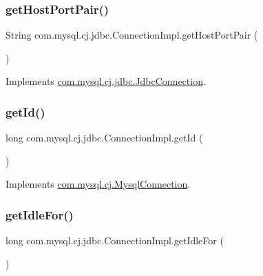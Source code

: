 \subsubsection{\texorpdfstring{get\+Host\+Port\+Pair()}{getHostPortPair()}}
{\footnotesize\ttfamily String com.\+mysql.\+cj.\+jdbc.\+Connection\+Impl.\+get\+Host\+Port\+Pair (\begin{DoxyParamCaption}{ }\end{DoxyParamCaption})}



Implements \mbox{\hyperlink{interfacecom_1_1mysql_1_1cj_1_1jdbc_1_1_jdbc_connection_aa0cc0cf69f201efa68eecad1d7a62eef}{com.\+mysql.\+cj.\+jdbc.\+Jdbc\+Connection}}.

\mbox{\label{classcom_1_1mysql_1_1cj_1_1jdbc_1_1_connection_impl_ae835f7c80a3c9705b622a244ba07e7e3}} 
\subsubsection{\texorpdfstring{get\+Id()}{getId()}}
{\footnotesize\ttfamily long com.\+mysql.\+cj.\+jdbc.\+Connection\+Impl.\+get\+Id (\begin{DoxyParamCaption}{ }\end{DoxyParamCaption})}



Implements \mbox{\hyperlink{interfacecom_1_1mysql_1_1cj_1_1_mysql_connection_aba5831e0b7016bc8b3fffa0c2e728fee}{com.\+mysql.\+cj.\+Mysql\+Connection}}.

\mbox{\label{classcom_1_1mysql_1_1cj_1_1jdbc_1_1_connection_impl_a628961d1155b35d0582a3198c2a6bb83}} 
\subsubsection{\texorpdfstring{get\+Idle\+For()}{getIdleFor()}}
{\footnotesize\ttfamily long com.\+mysql.\+cj.\+jdbc.\+Connection\+Impl.\+get\+Idle\+For (\begin{DoxyParamCaption}{ }\end{DoxyParamCaption})}

